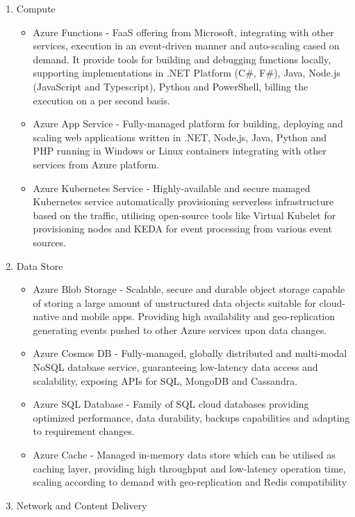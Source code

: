 \begin{enumerate}
   \item Compute
   \begin{itemize}
       \item Azure Functions - FaaS offering from Microsoft, integrating with other services, execution in an event-driven manner and auto-scaling cased on demand. It provide tools for building and debugging functions locally, supporting implementations in .NET Platform (C\#, F\#), Java, Node.js (JavaScript and Typescript), Python and PowerShell, billing the execution on a per second basis.
       \item Azure App Service - Fully-managed platform for building, deploying and scaling web applications written in .NET, Node.js, Java, Python and PHP running in Windows or Linux containers integrating with other services from Azure platform.
       \item Azure Kubernetes Service - Highly-available and secure managed Kubernetes service automatically provisioning serverless infrastructure based on the traffic, utilising open-source tools like Virtual Kubelet for provisioning nodes and KEDA for event processing from various event sources.
   \end{itemize}
   \item Data Store
   \begin{itemize}
       \item Azure Blob Storage - Scalable, secure and durable object storage capable of storing a large amount of unstructured data objects suitable for cloud-native and mobile apps. Providing high availability and geo-replication generating events pushed to other Azure services upon data changes.
       \item Azure Cosmos DB - Fully-managed, globally distributed and multi-modal NoSQL database service, guaranteeing low-latency data access and scalability, exposing APIs for SQL, MongoDB and Cassandra.
       \item Azure SQL Database - Family of SQL cloud databases providing optimized performance, data durability, backups capabilities and adapting to requirement changes.
       \item Azure Cache - Managed in-memory data store which can be utilised as caching layer, providing high throughput and low-latency operation time, scaling according to demand with geo-replication and Redis compatibility
   \end{itemize}
   \item Network and Content Delivery

\end{enumerate}

